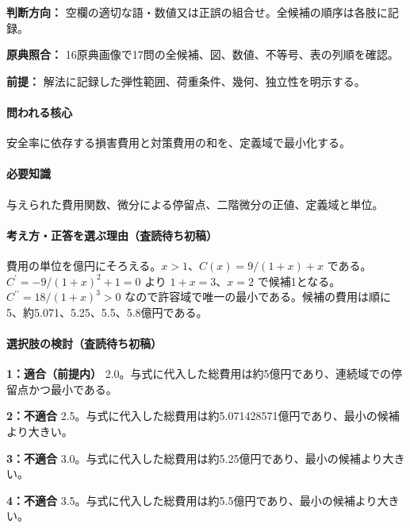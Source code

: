\noindent\textbf{判断方向：} 空欄の適切な語・数値又は正誤の組合せ。全候補の順序は各肢に記録。\par

\noindent\textbf{原典照合：} 16原典画像で17問の全候補、図、数値、不等号、表の列順を確認。\par

\noindent\textbf{前提：} 解法に記録した弾性範囲、荷重条件、幾何、独立性を明示する。\par

\paragraph{問われる核心} 安全率に依存する損害費用と対策費用の和を、定義域で最小化する。

\paragraph{必要知識} 与えられた費用関数、微分による停留点、二階微分の正値、定義域と単位。

\paragraph{考え方・正答を選ぶ理由（査読待ち初稿）} 費用の単位を億円にそろえる。\(x>1\)、\(C(x)=9/(1+x)+x\) である。\(C^\prime=-9/(1+x)^2+1=0\) より \(1+x=3\)、\(x=2\) で候補1となる。\(C^{\prime\prime}=18/(1+x)^3>0\) なので許容域で唯一の最小である。候補の費用は順に5、約5.071、5.25、5.5、5.8億円である。

\paragraph{選択肢の検討（査読待ち初稿）}\mbox{}\par

\noindent\textbf{1：適合（前提内）} 2.0。与式に代入した総費用は約5億円であり、連続域での停留点かつ最小である。\par

\noindent\textbf{2：不適合} 2.5。与式に代入した総費用は約5.071428571億円であり、最小の候補より大きい。\par

\noindent\textbf{3：不適合} 3.0。与式に代入した総費用は約5.25億円であり、最小の候補より大きい。\par

\noindent\textbf{4：不適合} 3.5。与式に代入した総費用は約5.5億円であり、最小の候補より大きい。\par

